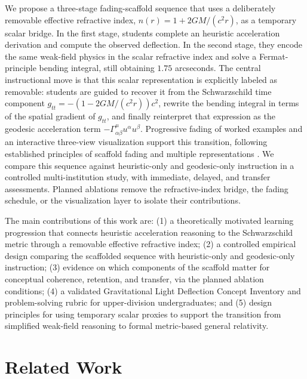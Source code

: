 \documentclass{article}
\begin{document}
We propose a three-stage fading-scaffold sequence that uses a deliberately removable effective refractive index, \(n(r)=1+2GM/(c^2 r)\), as a temporary scalar bridge. In the first stage, students complete an heuristic acceleration derivation and compute the observed deflection. In the second stage, they encode the same weak-field physics in the scalar refractive index and solve a Fermat-principle bending integral, still obtaining \(1.75\) arcseconds. The central instructional move is that this scalar representation is explicitly labeled as removable: students are guided to recover it from the Schwarzschild time component \(g_{tt}=-(1-2GM/(c^2 r))c^2\), rewrite the bending integral in terms of the spatial gradient of \(g_{tt}\), and finally reinterpret that expression as the geodesic acceleration term \(-\Gamma^\mu_{\alpha\beta}u^\alpha u^\beta\). Progressive fading of worked examples and an interactive three-view visualization support this transition, following established principles of scaffold fading and multiple representations \cite{renkl2003structuring,ainsworth2006deft,puntambekar2005tools}. We compare this sequence against heuristic-only and geodesic-only instruction in a controlled multi-institution study, with immediate, delayed, and transfer assessments. Planned ablations remove the refractive-index bridge, the fading schedule, or the visualization layer to isolate their contributions.

The main contributions of this work are: (1) a theoretically motivated learning progression that connects heuristic acceleration reasoning to the Schwarzschild metric through a removable effective refractive index; (2) a controlled empirical design comparing the scaffolded sequence with heuristic-only and geodesic-only instruction; (3) evidence on which components of the scaffold matter for conceptual coherence, retention, and transfer, via the planned ablation conditions; (4) a validated Gravitational Light Deflection Concept Inventory and problem-solving rubric for upper-division undergraduates; and (5) design principles for using temporary scalar proxies to support the transition from simplified weak-field reasoning to formal metric-based general relativity.

\section{Related Work}
\label{sec:related}
\end{document}
